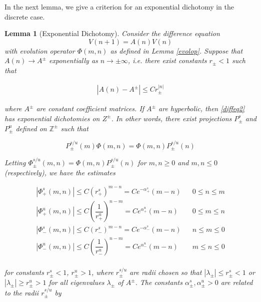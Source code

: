 \documentclass[12pt]{article}
\def\Z{{\mathbb Z}}
\newtheorem{lemma}{Lemma}
\begin{document}
In the next lemma, we give a criterion for an exponential dichotomy in the discrete case.


\begin{lemma}[Exponential Dichotomy]\label{dichotomy}
Consider the difference equation
\begin{equation}\label{diffeq3}
V(n+1) = A(n) V(n)
\end{equation}
with evolution operator $\Phi(m, n)$ as defined in Lemma \ref{evolop}. Suppose that $A(n) \rightarrow A^\pm$ exponentially as $n \rightarrow \pm \infty$, i.e. there exist constants $r_\pm < 1$ such that

\begin{align*}
|A(n) - A^\pm| \leq C r_\pm^{|n|}
\end{align*}

where $A^\pm$ are constant coefficient matrices. If $A^\pm$ are hyperbolic, then \eqref{diffeq2} has exponential dichotomies on $Z^\pm$. In other words, there exist projections $P_\pm^s$ and $P_\pm^u$ defined on $\Z^\pm$ such that

\begin{equation}\label{projcommute}
P_\pm^{s/u}(m) \Phi(m, n) =  \Phi(m, n) P_\pm^{s/u}(n)
\end{equation}

Letting $\Phi_\pm^{s/u}(m, n) = \Phi(m, n) P_\pm^{s/u}(n)$ for $m, n \geq 0$ and $m, n \leq 0$ (respectively), we have the estimates

\begin{align*}
|\Phi_+^s(m, n)| \leq C (r_+^s)^{m - n} = C e^{-\alpha_+^s}(m - n) && 0 \leq n \leq m \\
|\Phi_+^u(m, n)| \leq C \left( \dfrac{1}{r_+^u} \right)^{n-m} = C e^{\alpha_+^u}(m - n) && 0 \leq m \leq n \\
|\Phi_-^s(m, n)| \leq C (r_-^s)^{m - n} = C e^{-\alpha_-^s}(m - n) && n \leq m \leq 0 \\
|\Phi_-^u(m, n)| \leq C \left( \dfrac{1}{r_-^u} \right)^{n-m} = C e^{\alpha_-^u}(m - n) && m \leq n \leq 0\\
\end{align*}

for constants $r_\pm^s < 1$, $r_\pm^u > 1$, where $r_\pm^{s/u}$ are radii chosen so that $|\lambda_\pm| \leq r_\pm^s < 1$ or $|\lambda_\pm| \geq r_\pm^u > 1$ for all eigenvalues $\lambda_\pm$ of $A^\pm$. The constants $\alpha_\pm^s, \alpha_\pm^u > 0$ are related to the radii $r_\pm^{s/u}$ by


\end{lemma}
\end{document}
